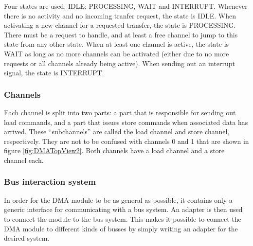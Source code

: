 Four states are used: IDLE; PROCESSING, WAIT and INTERRUPT.
Whenever there is no activity and no incoming tranfer request, the state is IDLE.
When activating a new channel for a requested transfer, the state is PROCESSING. 
There must be a request to handle, and at least a free channel to jump to this state from any other state.
When at least one channel is active, the state is WAIT as long as no more channels can be activated (either due to no more requests or all channels already being active).
When sending out an interrupt signal, the state is INTERRUPT.

\subsubsection{Channels}
Each channel is split into two parts: a part that is responsible for sending out load
commands, and a part that issues store commands when associated data has arrived. 
These ``subchannels'' are called the load channel and store channel, respectively.
They are not to be confused with channels 0 and 1 that are shown in figure \ref{fig:DMATopView2}.
Both channels have a load channel and a store channel each.

\subsubsection{Bus interaction system}
In order for the DMA module to be as general as possible, it contains only a generic
interface for communicating with a bus system. An adapter is then used to connect
the module to the bus system. This makes it possible to connect the DMA module to
different kinds of busses by simply writing an adapter for the desired system.

%
%
